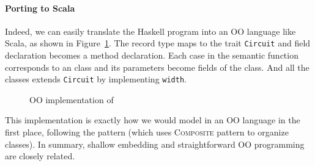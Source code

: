 \paragraph{Porting to Scala}
Indeed, we can easily translate the Haskell program into an OO
language like Scala, as shown in Figure~\ref{code:base}.
The record type maps to the trait \lstinline{Circuit} and field
declaration becomes a method declaration.
Each case in the semantic function corresponds to an class and its parameters become fields of the class.
And all the classes extends \lstinline{Circuit} by implementing \lstinline{width}.

\begin{figure}
\caption{OO implementation of \dsl}
\label{code:base}
\end{figure}

This implementation is exactly how we would model \dsl in an OO language in the first
place, following the \interp pattern (which uses \textsc{Composite} pattern to
organize classes).
In summary, shallow embedding and straightforward OO programming are closely
related.
